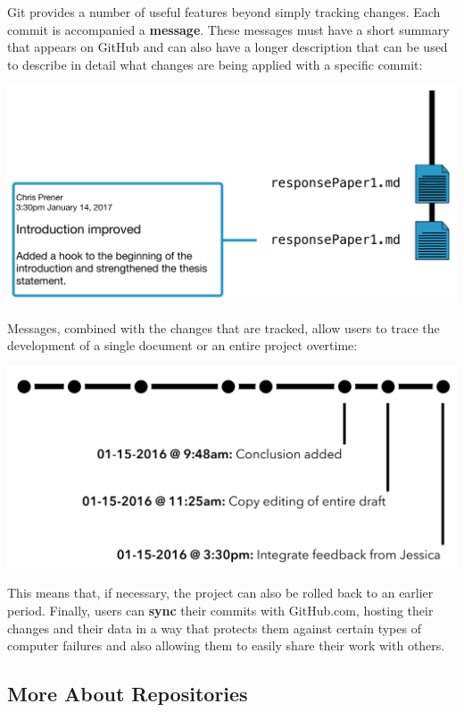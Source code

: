 \documentclass[]{book}
\theoremstyle{definition}
\theoremstyle{definition}
\theoremstyle{definition}
\theoremstyle{remark}
\begin{document}
Git provides a number of useful features beyond simply tracking changes.
Each commit is accompanied a \textbf{message}. These messages must have
a short summary that appears on GitHub and can also have a longer
description that can be used to describe in detail what changes are
being applied with a specific commit:

\begin{center}\includegraphics[width=0.95\linewidth]{images/gitFlow03} \end{center}

Messages, combined with the changes that are tracked, allow users to
trace the development of a single document or an entire project
overtime:

\begin{center}\includegraphics[width=0.95\linewidth]{images/gitFlow04} \end{center}

This means that, if necessary, the project can also be rolled back to an
earlier period. Finally, users can \textbf{sync} their commits with
GitHub.com, hosting their changes and their data in a way that protects
them against certain types of computer failures and also allowing them
to easily share their work with others.

\subsection{More About Repositories}\label{more-about-repositories}
\end{document}
